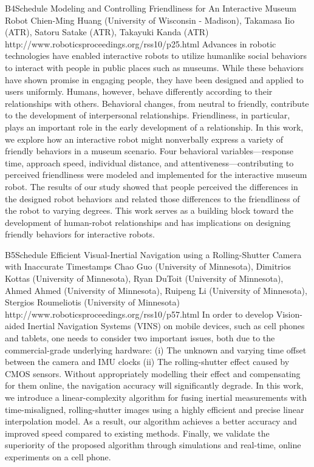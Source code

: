 \begin{spacing}{1.0}
\descriptionPaper
{B4}{Schedule}
{
Modeling and Controlling Friendliness for An Interactive Museum Robot
}
{
Chien-Ming Huang (University of Wisconsin - Madison), Takamasa Iio (ATR), Satoru Satake (ATR), Takayuki Kanda (ATR)
}
{
http://www.roboticsproceedings.org/rss10/p25.html
}
{
Advances in robotic technologies have enabled interactive robots to utilize humanlike social behaviors to interact with people in public places such as museums. While these behaviors have shown promise in engaging people, they have been designed and applied to users uniformly. Humans, however, behave differently according to their relationships with others. Behavioral changes, from neutral to friendly, contribute to the development of interpersonal relationships. Friendliness, in particular, plays an important role in the early development of a relationship. In this work, we explore how an interactive robot might nonverbally express a variety of friendly behaviors in a museum scenario. Four behavioral variables—response time, approach speed, individual distance, and attentiveness—contributing to perceived friendliness were modeled and implemented for the interactive museum robot. The results of our study showed that people perceived the differences in the designed robot behaviors and related those differences to the friendliness of the robot to varying degrees. This work serves as a building block toward the development of human-robot relationships and has implications on designing friendly behaviors for interactive robots.
}


\descriptionPaper
{B5}{Schedule}
{
Efficient Visual-Inertial Navigation using a Rolling-Shutter Camera with Inaccurate Timestamps
}
{
Chao Guo (University of Minnesota), Dimitrios Kottas (University of Minnesota), Ryan DuToit (University of Minnesota), Ahmed Ahmed (University of Minnesota), Ruipeng Li (University of Minnesota), Stergios Roumeliotis (University of Minnesota)
}
{
http://www.roboticsproceedings.org/rss10/p57.html
}
{
In order to develop Vision-aided Inertial Navigation Systems (VINS) on mobile devices, such as cell phones and tablets, one needs to consider two important issues, both due to the commercial-grade underlying hardware: (i) The unknown and varying time offset between the camera and IMU clocks (ii) The rolling-shutter effect caused by CMOS sensors. Without appropriately modelling their effect and compensating for them online, the navigation accuracy will significantly degrade. In this work, we introduce a linear-complexity algorithm for fusing inertial measurements with time-misaligned, rolling-shutter images using a highly efficient and precise linear interpolation model. As a result, our algorithm achieves a better accuracy and improved speed compared to existing methods. Finally, we validate the superiority of the proposed algorithm through simulations and real-time, online experiments on a cell phone.
}




\end{spacing}
